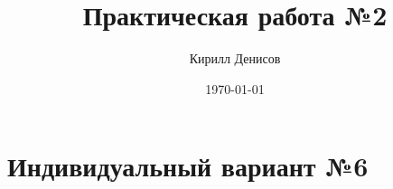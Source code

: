 \documentclass[a4paper,14pt]{extarticle}
\author{Кирилл Денисов}
\title{Практическая работа №2}
\date{\today}
\newcommand{\pathToCommonFolder}{/home/denilai/Desktop/LaTeX/Common}
\begin{document}
	\thispagestyle{empty}
	
	
	
	\newpage
	\tableofcontents
	\newpage

\section{Индивидуальный вариант №6}
\end{document}
